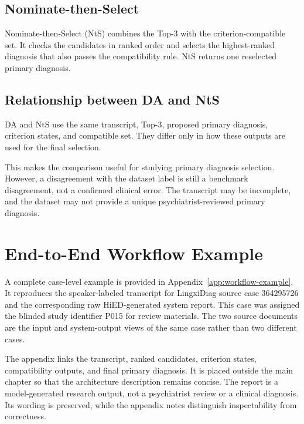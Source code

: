\documentclass[12pt,a4paper,oneside]{report}
\begin{document}
\subsection{Nominate-then-Select}
\label{sec:nominate-then-select-policy}

Nominate-then-Select (NtS) combines the Top-3 with the
criterion-compatible set. It checks the candidates in ranked order and
selects the highest-ranked diagnosis that also passes the compatibility
rule. NtS returns one reselected primary diagnosis.

\subsection{Relationship between DA and NtS}
\label{sec:da-nts-relationship}
\label{sec:primary-selection-boundary}

DA and NtS use the same transcript, Top-3, proposed primary diagnosis,
criterion states, and compatible set. They differ only in how these
outputs are used for the final selection.

This makes the comparison useful for studying primary diagnosis
selection. However, a disagreement with the dataset label is still a
benchmark disagreement, not a confirmed clinical error. The transcript
may be incomplete, and the dataset may not provide a unique
psychiatrist-reviewed primary diagnosis.

\section{End-to-End Workflow Example}
\label{sec:running-example}
\label{sec:worked-example}

A complete case-level example is provided in
Appendix~\ref{app:workflow-example}. It reproduces the speaker-labeled
transcript for LingxiDiag source case 364295726 and the corresponding raw
HiED-generated system report. This case was assigned the blinded study
identifier P015 for review materials. The two source documents are the
input and system-output views of the same case rather than two different
cases.

The appendix links the transcript, ranked candidates, criterion states,
compatibility outputs, and final primary diagnosis. It is placed outside
the main chapter so that the architecture description remains concise.
The report is a model-generated research output, not a psychiatrist review
or a clinical diagnosis. Its wording is preserved, while the appendix
notes distinguish inspectability from correctness.
\end{document}
